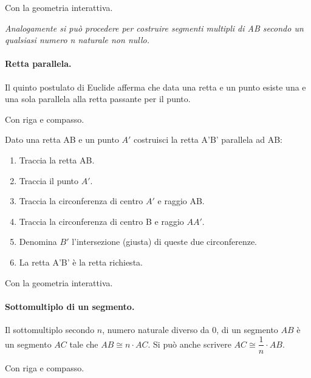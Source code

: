 Con la geometria interattiva.



\textit{Analogamente si può procedere per costruire segmenti multipli di AB 
secondo un qualsiasi numero n naturale non nullo.}

\paragraph{Retta parallela.} Il quinto postulato di Euclide afferma che data 
una retta e un punto esiste una e una sola parallela alla retta passante per il 
punto.

Con riga e compasso.

\begin{procedura}\label{proc:fonda_parallela}
  Dato una retta AB e un punto \(A'\) costruisci la retta A'B' parallela ad AB:
  \begin{enumerate} [nosep]
    \item 
    Traccia la retta AB.    
    \item 
    Traccia il punto \(A'\).    
    \item 
    Traccia la circonferenza di centro \(A'\) e raggio AB.   
    \item 
    Traccia la circonferenza di centro B e raggio \(AA'\).
    \item 
    Denomina \(B'\) l'intersezione (giusta) di queste due circonferenze. 
    \item 
    La retta A'B' è la retta richiesta.    
  \end{enumerate}
\end{procedura}

Con la geometria interattiva.



\paragraph{Sottomultiplo di un segmento.} Il sottomultiplo secondo 
$n$, numero naturale diverso da 0, di un segmento $AB$ è un segmento 
$AC$ tale che $AB\cong n\cdot AC$. Si può anche scrivere $AC \cong 
\dfrac{1}{n}\cdot AB$.

Con riga e compasso.

